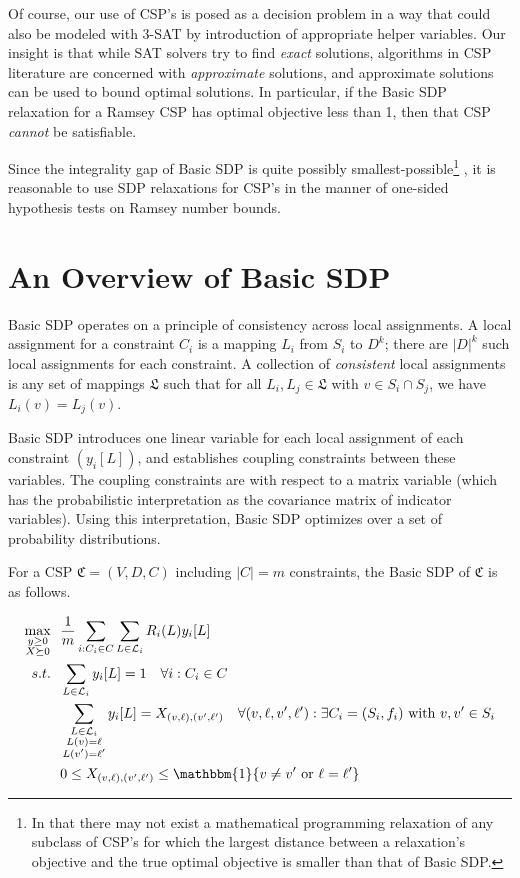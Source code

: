 \documentclass[12pt]{article} %
\begin{document}
Of course, our use of CSP's is posed as a decision problem in a way that could also be modeled with 3-SAT by introduction of appropriate helper variables. Our insight is that while SAT solvers try to find \textit{exact} solutions, algorithms in CSP literature are concerned with \textit{approximate} solutions, and approximate solutions can be used to bound optimal solutions. In particular, if the Basic SDP relaxation for a Ramsey CSP has optimal objective less than 1, then that CSP \textit{cannot} be satisfiable. 

Since the integrality gap of Basic SDP is quite possibly smallest-possible\footnote{In that there may not exist a mathematical programming relaxation of any subclass of CSP's for which the largest distance between a relaxation's objective and the true optimal objective is smaller than that of Basic SDP.} \cite{raghavendra2008optimal}, it is reasonable to use SDP relaxations for CSP's in the manner of one-sided hypothesis tests on Ramsey number bounds.

\section{An Overview of Basic SDP}

Basic SDP operates on a principle of consistency across local assignments. A local assignment for a constraint $C_i$ is a mapping $L_i$ from $S_i$ to $D^{k}$; there are $|D|^k$ such local assignments for each constraint. A collection of \textit{consistent} local assignments is any set of mappings $\mathfrak{L}$ such that for all $L_i, L_j \in \mathfrak{L}$ with $v \in S_i \cap S_j$, we have $L_i(v) = L_j(v)$.

Basic SDP introduces one linear variable for each local assignment of each constraint $(y_i[L])$, and establishes coupling constraints between these variables. The coupling constraints are with respect to a matrix variable (which has the probabilistic interpretation as the covariance matrix of indicator variables). Using this interpretation, Basic SDP optimizes over a set of probability distributions.

For a CSP $\mathfrak{C} = (V,D,C)$ including $|C| = m$ constraints, the Basic SDP of $\mathfrak{C}$ is as follows.

\begin{align}
\operatorname*{max}_{\substack{y \geq 0 \\  X \succeq 0}} ~ & ~ \frac{1}{m}\sum\limits_{i:C_i\in C} \sum\limits_{L\in \mathcal{L}_i} R_i(L)y_i[L]  \nonumber  \\
s.t. ~ & ~ \sum\limits_{L \in \mathcal{L}_i} y_i[L] = 1  \quad \forall i : C_i \in C \\
& ~ \sum\limits_{\substack{L \in \mathcal{L}_i \\ L(v)=\ell \\ L(v')=\ell '}} y_i[L] = X_{(v,\ell),(v',\ell')}  \quad \forall (v,\ell,v',\ell') : \exists C_i = (S_i, f_i) \text{ with } v,v' \in S_i \\
& ~ 0 \leq  X_{(v,\ell),(v',\ell')}  \leq \mathbbm{1}\{ v \neq v' \text{ or } \ell = \ell' \}
\end{align}
\end{document}
